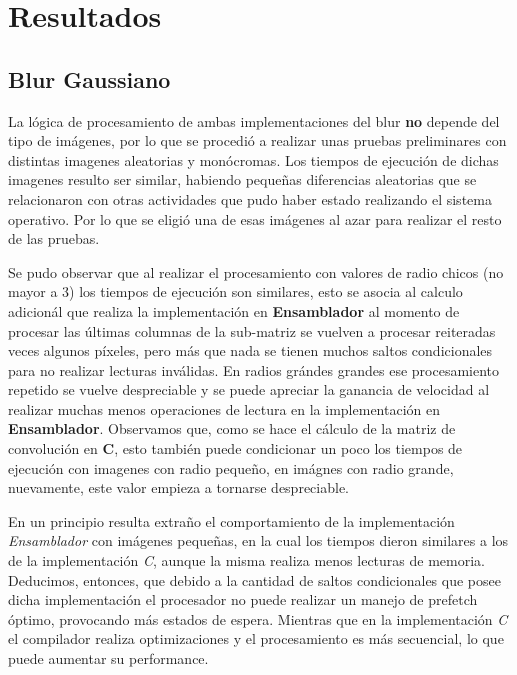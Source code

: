 \section{Resultados}
\FloatBarrier
\subsection{Blur Gaussiano}

La l\'ogica de procesamiento de ambas implementaciones del blur \textbf{no} depende del tipo de im\'agenes, por lo que se procedi\'o a realizar unas pruebas preliminares con distintas imagenes aleatorias y mon\'ocromas. Los tiempos de ejecuci\'on de dichas imagenes resulto ser similar, habiendo peque\~nas diferencias aleatorias que se relacionaron con otras actividades que pudo haber estado realizando el sistema operativo. Por lo que se eligi\'o una de esas im\'agenes al azar para realizar el resto de las pruebas.

Se pudo observar que al realizar el procesamiento con valores de radio chicos (no mayor a 3) los tiempos de ejecuci\'on son similares, esto se asocia al calculo adicion\'al que realiza la implementaci\'on en \textbf{Ensamblador} al momento de procesar las \'ultimas columnas de la sub-matriz se vuelven a procesar reiteradas veces algunos p\'ixeles, pero m\'as que nada se tienen muchos saltos condicionales para no realizar lecturas inv\'alidas. En radios gr\'andes grandes ese procesamiento repetido se vuelve despreciable y se puede apreciar la ganancia de velocidad al realizar muchas menos operaciones de lectura en la implementaci\'on en \textbf{Ensamblador}.
Observamos que, como se hace el c\'alculo de la matriz de convoluci\'on en \textbf{C}, esto tambi\'en puede condicionar un poco los tiempos de ejecuci\'on con imagenes con radio peque\~no, en im\'agnes con radio grande, nuevamente, este valor empieza a tornarse despreciable.

En un principio resulta extra\~no el comportamiento de la implementaci\'on \emph{Ensamblador} con im\'agenes peque\~nas, en la cual los tiempos dieron similares a los de la implementaci\'on \emph{C}, aunque la misma realiza menos lecturas de memoria. Deducimos, entonces, que debido a la cantidad de saltos condicionales que posee dicha implementaci\'on el procesador no puede realizar un manejo de prefetch \'optimo, provocando m\'as estados de espera. Mientras que en la implementaci\'on \emph{C} el compilador realiza optimizaciones y el procesamiento es m\'as secuencial, lo que puede aumentar su performance.

